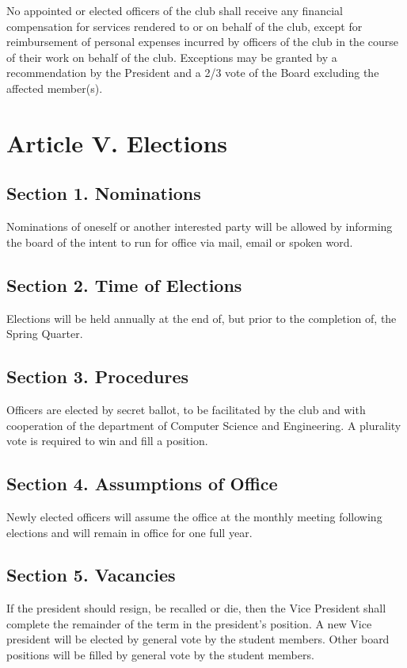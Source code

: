 \documentclass{article}
\begin{document}
    No appointed or elected officers of the club shall receive any financial compensation for services rendered to or on behalf of the club, except for reimbursement of personal expenses incurred by officers of the club in the course of their work on behalf of the club. Exceptions may be granted by a recommendation by the President and a 2/3 vote of the Board excluding the affected member(s).

\section{Article V. Elections}
  \subsection{Section 1. Nominations}
    Nominations of oneself or another interested party will be allowed by informing the board of the intent to run for office via mail, email or spoken word.

  \subsection{Section 2. Time of Elections}
    Elections will be held annually at the end of, but prior to the completion of, the Spring Quarter.

  \subsection{Section 3. Procedures}
    Officers are elected by secret ballot, to be facilitated by the club and with cooperation of the department of Computer Science and Engineering. A plurality vote is required to win and fill a position.

  \subsection{Section 4. Assumptions of Office}
    Newly elected officers will assume the office at the monthly meeting following elections and will remain in office for one full year.

  \subsection{Section 5. Vacancies}
    If the president should resign, be recalled or die, then the Vice President shall complete the remainder of the term in the president’s position. A new Vice president will be elected by general vote by the student members.  Other board positions will be filled by general vote by the student members.
\end{document}
